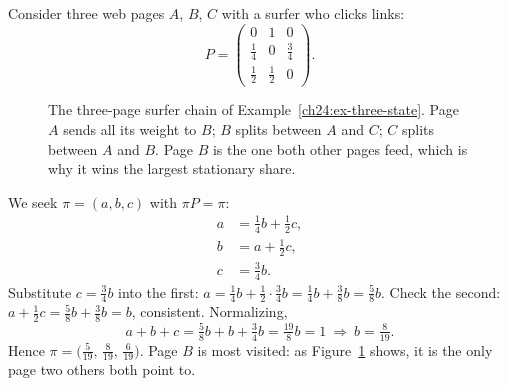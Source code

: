 \begin{example}
\label{ch24:ex-three-state}
Consider three web pages $A$, $B$, $C$ with a surfer who clicks links:
\[
  P = \begin{pmatrix}
    0 & 1 & 0 \\
    \tfrac14 & 0 & \tfrac34 \\
    \tfrac12 & \tfrac12 & 0
  \end{pmatrix}.
\]

\begin{figure}[H]
  \centering
  \caption{The three-page surfer chain of Example~\ref{ch24:ex-three-state}.
  Page $A$ sends all its weight to $B$; $B$ splits between $A$ and $C$; $C$ splits
  between $A$ and $B$. Page $B$ is the one both other pages feed, which is why it
  wins the largest stationary share.}
  \label{ch24:fig-three-state-diagram}
\end{figure}

We seek $\pi = (a,b,c)$ with $\pi P = \pi$:
\[
  \begin{aligned}
    a &= \tfrac14 b + \tfrac12 c, \\
    b &= a + \tfrac12 c, \\
    c &= \tfrac34 b.
  \end{aligned}
\]
Substitute $c = \tfrac34 b$ into the first: $a = \tfrac14 b + \tfrac12\cdot\tfrac34 b
= \tfrac14 b + \tfrac38 b = \tfrac58 b$. Check the second:
$a + \tfrac12 c = \tfrac58 b + \tfrac38 b = b$, consistent. Normalizing,
\[
  a + b + c = \tfrac58 b + b + \tfrac34 b = \tfrac{19}{8} b = 1
  \ \Rightarrow\ b = \tfrac{8}{19}.
\]
Hence $\pi = \bigl(\tfrac{5}{19},\,\tfrac{8}{19},\,\tfrac{6}{19}\bigr)$. Page $B$
is most visited: as Figure~\ref{ch24:fig-three-state-diagram} shows, it is the
only page two others both point to.
\end{example}

